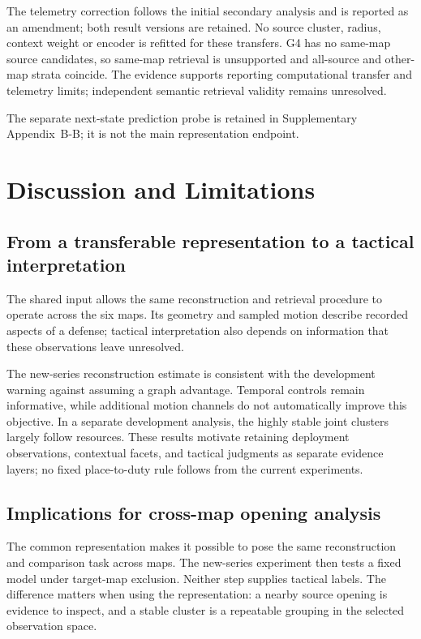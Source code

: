 The telemetry correction follows the initial secondary analysis and is reported as an amendment; both result versions are retained. No source cluster, radius, context weight or encoder is refitted for these transfers. G4 has no same-map source candidates, so same-map retrieval is unsupported and all-source and other-map strata coincide. The evidence supports reporting computational transfer and telemetry limits; independent semantic retrieval validity remains unresolved.

The separate next-state prediction probe is retained in Supplementary Appendix~B-B; it is not the main representation endpoint.

\section{Discussion and Limitations}
\subsection{From a transferable representation to a tactical interpretation}
The shared input allows the same reconstruction and retrieval procedure to operate across the six maps. Its geometry and sampled motion describe recorded aspects of a defense; tactical interpretation also depends on information that these observations leave unresolved.

The new-series reconstruction estimate is consistent with the development warning against assuming a graph advantage. Temporal controls remain informative, while additional motion channels do not automatically improve this objective. In a separate development analysis, the highly stable joint clusters largely follow resources. These results motivate retaining deployment observations, contextual facets, and tactical judgments as separate evidence layers; no fixed place-to-duty rule follows from the current experiments. %

\subsection{Implications for cross-map opening analysis}
The common representation makes it possible to pose the same reconstruction and comparison task across maps. The new-series experiment then tests a fixed model under target-map exclusion. Neither step supplies tactical labels. The difference matters when using the representation: a nearby source opening is evidence to inspect, and a stable cluster is a repeatable grouping in the selected observation space.


